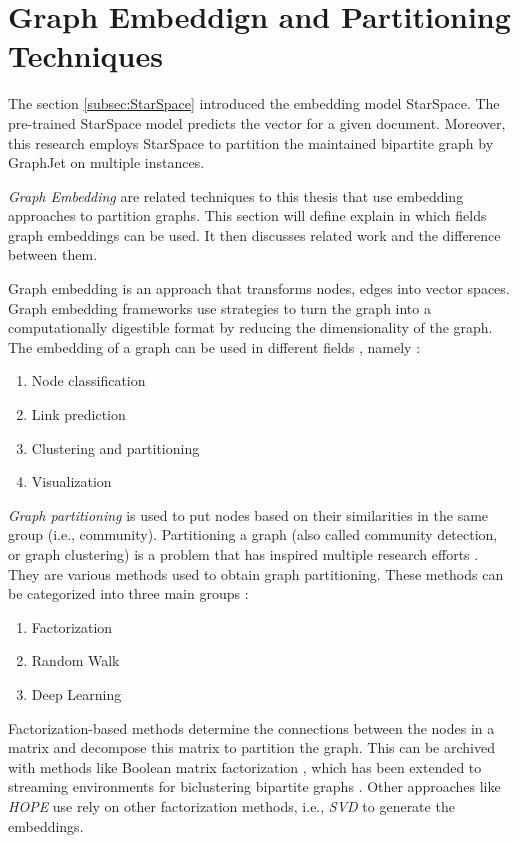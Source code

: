 \section{Graph Embeddign and Partitioning Techniques}
\label{sec:graph-partitioning-techniques}
The section \ref{subsec:StarSpace} introduced the embedding model StarSpace. The pre-trained StarSpace model predicts the vector for a given document. Moreover, this research employs StarSpace to partition the maintained bipartite graph by GraphJet on multiple instances. 


\emph{Graph Embedding} are related techniques to this thesis that use embedding approaches to partition graphs. This section will define explain in which fields graph embeddings can be used. It then discusses related work and the difference between them.


Graph embedding is an approach that transforms nodes, edges into vector spaces. Graph embedding frameworks use strategies to turn the graph into a computationally digestible format by reducing the dimensionality of the graph. The embedding of a graph can be used in different fields \cite{goyalGraphEmbeddingTechniques2018}, namely : 

\begin{enumerate}
    \item Node classification
    \item Link prediction
    \item Clustering and partitioning
    \item Visualization
\end{enumerate}


\emph{Graph partitioning} is used to put nodes based on their similarities in the same group (i.e., community). Partitioning a graph (also called community detection, or graph clustering) is a problem that has inspired multiple research efforts \cite{fortunatoCommunityDetectionGraphs2010}. They are various methods used to obtain graph partitioning. These methods can be categorized into three main groups \cite{goyalGraphEmbeddingTechniques2018}:

\begin{enumerate}
    \item Factorization
    \item Random Walk
    \item Deep Learning
\end{enumerate}


Factorization-based methods determine the connections between the nodes in a matrix and decompose this matrix to partition the graph. This can be archived with methods like Boolean matrix factorization \cite{miettinenModelOrderSelection2011}, which has been extended to streaming environments for biclustering bipartite graphs \cite{neumannBiclusteringBooleanMatrix2020}. Other approaches like \emph{HOPE} \cite{ouAsymmetricTransitivityPreserving2016b} use rely on other factorization methods, i.e., \emph{SVD} \cite{vanloanGeneralizingSingularValue1976} to generate the embeddings.


